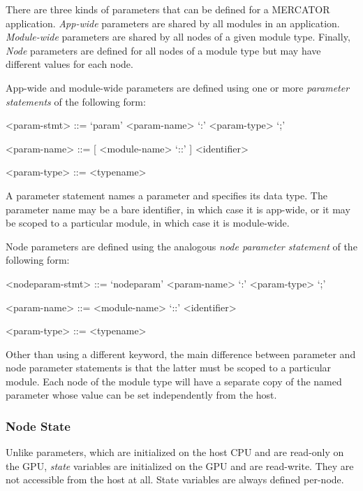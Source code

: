 \documentclass[11pt]{article}
\begin{document}
There are three kinds of parameters that can be defined for a
MERCATOR application.   \emph{App-wide} parameters are shared by
all modules in an application.  \emph{Module-wide} parameters are
shared by all nodes of a given module type.  Finally, \emph{Node}
parameters are defined for all nodes of a module type but may have
different values for each node.

App-wide and module-wide parameters are defined using one or more
\textit{parameter statements} of the following form:
\begin{grammar}

<param-stmt> ::= `param' <param-name> `:' <param-type> `;'

<param-name> ::= [ <module-name> `::' ] <identifier>

<param-type> ::= <typename>

\end{grammar}

A parameter statement names a parameter and specifies its data type.
The parameter name may be a bare identifier, in which case it is
app-wide, or it may be scoped to a particular module, in which case
it is module-wide.

Node parameters are defined using the analogous \textit{node parameter
statement} of the following form:
\begin{grammar}

<nodeparam-stmt> ::= `nodeparam' <param-name> `:' <param-type> `;'

<param-name> ::= <module-name> `::' <identifier>

<param-type> ::= <typename>

\end{grammar}

Other than using a different keyword, the main difference between
parameter and node parameter statements is that the latter must be
scoped to a particular module.  Each node of the module type will have
a separate copy of the named parameter whose value can be set
independently from the host.

\subsubsection{Node State}

Unlike parameters, which are initialized on the host CPU and are
read-only on the GPU, \emph{state} variables are initialized on the
GPU and are read-write.  They are not accessible from the host at all.
State variables are always defined per-node.
\end{document}

